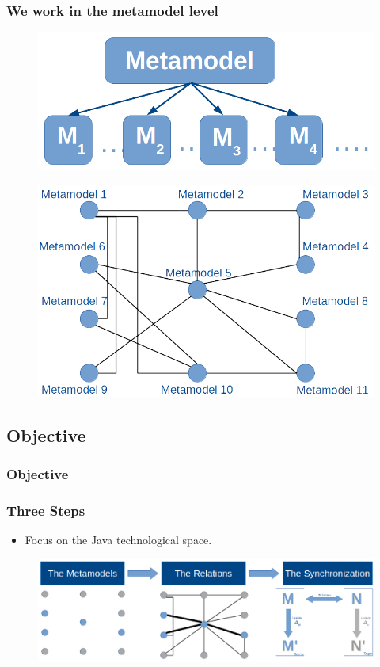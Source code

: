 \documentclass{beamer}
\begin{document}
\begin{frame}[t]
	\frametitle{We work in the metamodel level}
	\begin{figure}
		\includegraphics[scale=0.14]{metamodels_generic}
	\end{figure}
	\pause
	\vskip -10pt
	\begin{figure}
		\includegraphics[scale=0.30]{network_metamodels_generic}
	\end{figure}
\end{frame}

\subsection{Objective}
\begin{frame}
	\frametitle{Objective}
\end{frame}

\begin{frame}[t]
	\frametitle{Three Steps}
	\begin{itemize}
		\item Focus on the Java technological space.
	\end{itemize}
	\pause
	\begin{figure}
		\vskip -5pt
		\includegraphics[scale=0.3]{objective}
	\end{figure}
\end{frame}
\end{document}

